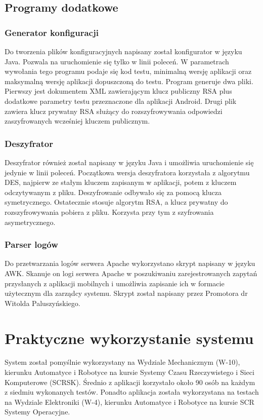 \documentclass[eng]{mgr}
\begin{document}
		\section{Programy dodatkowe}
		
			\subsection{Generator konfiguracji}
			Do tworzenia plików konfiguracyjnych napisany został konfigurator w języku Java. Pozwala na uruchomienie się tylko w linii poleceń. W parametrach wywołania tego programu podaje się kod testu, minimalną wersję aplikacji oraz maksymalną wersję aplikacji dopuszczoną do testu. Program generuje dwa pliki. Pierwszy jest dokumentem XML zawierającym klucz publiczny RSA plus dodatkowe parametry testu przeznaczone dla aplikacji Android. Drugi plik zawiera klucz prywatny RSA służący do rozszyfrowywania odpowiedzi zaszyfrowanych wcześniej kluczem publicznym.
			
			\subsection{Deszyfrator}
			Deszyfrator również został napisany w języku Java i umożliwia uruchomienie się jedynie w linii poleceń. Początkowa wersja deszyfratora korzystała z algorytmu DES, najpierw ze stałym kluczem zapisanym w aplikacji, potem z kluczem odczytywanym z pliku. Deszyfrowanie odbywało się za pomocą klucza symetrycznego. Ostatecznie stosuje algorytm RSA, a klucz prywatny do rozszyfrowywania pobiera z pliku. Korzysta przy tym z szyfrowania asymetrycznego.
			
			\subsection{Parser logów}
			Do przetwarzania logów serwera Apache wykorzystano skrypt napisany w języku AWK. Skanuje on logi serwera Apache w poszukiwaniu zarejestrowanych zapytań przysłanych z aplikacji mobilnych i umożliwia zapisanie ich w formacie użytecznym dla zarządcy systemu. Skrypt został napisany przez Promotora dr Witolda Paluszyńskiego.
			

	\chapter{Praktyczne wykorzystanie systemu}
	
	System został pomyślnie wykorzystany na Wydziale Mechanicznym (W-10), kierunku Automatyce i Robotyce na kursie Systemy Czasu Rzeczywistego i Sieci Komputerowe (SCRSK). Średnio z aplikacji korzystało około 90 osób na każdym z siedmiu wykonanych testów. Ponadto aplikacja została wykorzystana na testach na Wydziale Elektroniki (W-4), kierunku Automatyce i Robotyce na kursie SCR Systemy Operacyjne.
	
\end{document}
